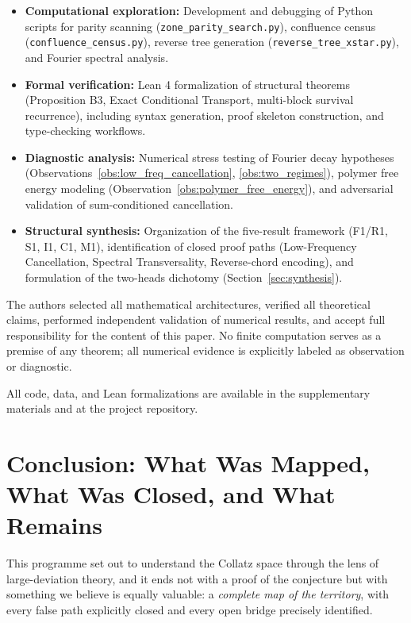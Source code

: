 \documentclass[12pt,a4paper]{article}
\begin{document}
\begin{itemize}
\item \textbf{Computational exploration:} Development and debugging of Python 
scripts for parity scanning (\texttt{zone\_parity\_search.py}), confluence 
census (\texttt{confluence\_census.py}), reverse tree generation 
(\texttt{reverse\_tree\_xstar.py}), and Fourier spectral analysis.

\item \textbf{Formal verification:} Lean 4 formalization of structural 
theorems (Proposition B3, Exact Conditional Transport, multi-block survival 
recurrence), including syntax generation, proof skeleton construction, and 
type-checking workflows.

\item \textbf{Diagnostic analysis:} Numerical stress testing of Fourier decay 
hypotheses (Observations~\ref{obs:low_freq_cancellation}, 
\ref{obs:two_regimes}), polymer free energy modeling 
(Observation~\ref{obs:polymer_free_energy}), and adversarial validation of 
sum-conditioned cancellation.

\item \textbf{Structural synthesis:} Organization of the five-result framework 
(F1/R1, S1, I1, C1, M1), identification of closed proof paths 
(Low-Frequency Cancellation, Spectral Transversality, Reverse-chord encoding), 
and formulation of the two-heads dichotomy (Section~\ref{sec:synthesis}).
\end{itemize}

The authors selected all mathematical architectures, verified all theoretical 
claims, performed independent validation of numerical results, and accept full 
responsibility for the content of this paper. No finite computation serves as 
a premise of any theorem; all numerical evidence is explicitly labeled as 
observation or diagnostic.

All code, data, and Lean formalizations are available in the supplementary 
materials and at the project repository.

\section{Conclusion: What Was Mapped, What Was Closed, and What Remains}
\label{sec:conclusion}

This programme set out to understand the Collatz space through the lens of
large-deviation theory, and it ends not with a proof of the conjecture but
with something we believe is equally valuable: a \emph{complete map of the
territory}, with every false path explicitly closed and every open bridge
precisely identified.
\end{document}
